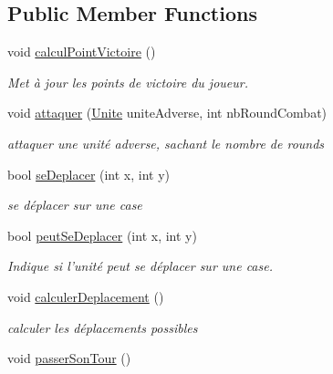 \subsection*{Public Member Functions}
\begin{DoxyCompactItemize}
\item 
\hypertarget{interface_small_world_1_1_inter_unite_a729d769c596c3df5e0f8d1d460de4d5e}{void \hyperlink{interface_small_world_1_1_inter_unite_a729d769c596c3df5e0f8d1d460de4d5e}{calcul\-Point\-Victoire} ()}\label{interface_small_world_1_1_inter_unite_a729d769c596c3df5e0f8d1d460de4d5e}

\begin{DoxyCompactList}\small\item\em Met à jour les points de victoire du joueur. \end{DoxyCompactList}\item 
void \hyperlink{interface_small_world_1_1_inter_unite_a9bce76356ba4531ed90ca35cc659af5f}{attaquer} (\hyperlink{class_small_world_1_1_unite}{Unite} unite\-Adverse, int nb\-Round\-Combat)
\begin{DoxyCompactList}\small\item\em attaquer une unité adverse, sachant le nombre de rounds \end{DoxyCompactList}\item 
bool \hyperlink{interface_small_world_1_1_inter_unite_aac3a60f40b315d1f3c1299e906ebb384}{se\-Deplacer} (int x, int y)
\begin{DoxyCompactList}\small\item\em se déplacer sur une case \end{DoxyCompactList}\item 
bool \hyperlink{interface_small_world_1_1_inter_unite_a28644be4f50b3370dd276a2aa274413f}{peut\-Se\-Deplacer} (int x, int y)
\begin{DoxyCompactList}\small\item\em Indique si l'unité peut se déplacer sur une case. \end{DoxyCompactList}\item 
void \hyperlink{interface_small_world_1_1_inter_unite_aaf0cbd85facc23d866aac19dad7f3e66}{calculer\-Deplacement} ()
\begin{DoxyCompactList}\small\item\em calculer les déplacements possibles \end{DoxyCompactList}\item 
\hypertarget{interface_small_world_1_1_inter_unite_ada8a39324c90c82eb25a978fa81b43f1}{void \hyperlink{interface_small_world_1_1_inter_unite_ada8a39324c90c82eb25a978fa81b43f1}{passer\-Son\-Tour} ()}\label{interface_small_world_1_1_inter_unite_ada8a39324c90c82eb25a978fa81b43f1}


\end{DoxyCompactItemize}
